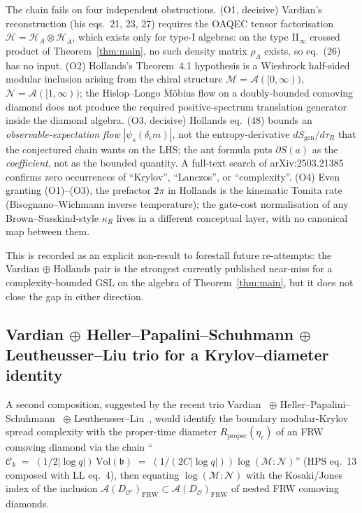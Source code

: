 \documentclass[11pt]{article}
\theoremstyle{definition}
\newcommand{\HH}{\mathcal{H}}
\renewcommand{\AA}{\mathcal{A}}
\newcommand{\MM}{\mathcal{M}}
\newcommand{\NN}{\mathcal{N}}
\newcommand{\OO}{\mathcal{O}}
\newcommand{\FRW}{\mathrm{FRW}}
\begin{document}
The chain fails on four independent obstructions. (O1, decisive) Vardian's reconstruction (his eqs.~21, 23, 27) requires the OAQEC tensor factorisation $\HH = \HH_A \otimes \HH_{\bar A}$, which exists only for type-I algebras: on the type II$_\infty$ crossed product of Theorem~\ref{thm:main}, no such density matrix $\rho_A$ exists, so eq.~(26) has no input. (O2) Hollands's Theorem~4.1 hypothesis is a Wiesbrock half-sided modular inclusion arising from the chiral structure $\MM=\AA([0,\infty))$, $\NN=\AA([1,\infty))$; the Hislop--Longo M\"obius flow on a doubly-bounded comoving diamond does not produce the required positive-spectrum translation generator inside the diamond algebra. (O3, decisive) Hollands eq.~(48) bounds an \emph{observable-expectation flow} $|\psi_s(\delta_\epsilon m)|$, not the entropy-derivative $d S_{\mathrm{gen}}/d\tau_R$ that the conjectured chain wants on the LHS; the ant formula puts $\partial S(a)$ as the \emph{coefficient}, not as the bounded quantity. A full-text search of arXiv:2503.21385 confirms zero occurrences of ``Krylov'', ``Lanczos'', or ``complexity''. (O4) Even granting (O1)--(O3), the prefactor $2\pi$ in Hollands is the kinematic Tomita rate (Bisognano--Wichmann inverse temperature); the gate-cost normalisation of any Brown--Susskind-style $\kappa_R$ lives in a different conceptual layer, with no canonical map between them.

This is recorded as an explicit non-result to forestall future re-attempts: the Vardian $\oplus$ Hollands pair is the strongest currently published near-miss for a complexity-bounded GSL on the algebra of Theorem~\ref{thm:main}, but it does not close the gap in either direction.

\subsection{\texorpdfstring{Vardian $\oplus$ Heller--Papalini--Schuhmann $\oplus$ Leutheusser--Liu trio for a Krylov--diameter identity}{Vardian + Heller-Papalini-Schuhmann + Leutheusser-Liu trio for a Krylov-diameter identity}}\label{ssec:fal-trio}

A second composition, suggested by the recent trio Vardian~\cite{Vardian2026ModularKrylov} $\oplus$ Heller--Papalini--Schuhmann~\cite{HellerPapaliniSchuhmann2025} $\oplus$ Leutheusser--Liu~\cite{LeutheusserLiu2025}, would identify the boundary modular-Krylov spread complexity with the proper-time diameter $R_{\mathrm{proper}}(\eta_c)$ of an FRW comoving diamond via the chain ``$\mathcal{C}_k \;=\; (1/2|\log q|)\,\mathrm{Vol}(\mathfrak{b}) \;=\; (1/(2C|\log q|))\log(\MM:\NN)$'' (HPS eq.~13 composed with LL eq.~4), then equating $\log(\MM:\NN)$ with the Kosaki/Jones index of the inclusion $\AA(D_{\OO'})_\FRW \subset \AA(D_\OO)_\FRW$ of nested FRW comoving diamonds.
\end{document}
